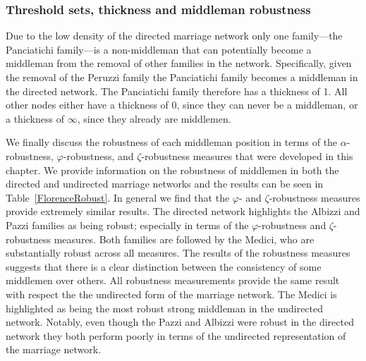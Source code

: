 \documentclass[11pt,fleqn]{article}
\begin{document}
\subsubsection{Threshold sets, thickness and middleman robustness}

Due to the low density of the directed marriage network only one family---the Panciatichi family---is a non-middleman that can potentially become a middleman from the removal of other families in the network. Specifically, given the removal of the Peruzzi family the Panciatichi family becomes a middleman in the directed network. The Panciatichi family therefore has a thickness of 1. All other nodes either have a thickness of 0, since they can never be a middleman, or a thickness of $\infty$, since they already are middlemen.

We finally discuss the robustness of each middleman position in terms of the $\alpha$-robustness, $\varphi$-robustness, and $\zeta$-robustness measures that were developed in this chapter. We provide information on the robustness of middlemen in both the directed and undirected marriage networks and the results can be seen in Table~\ref{FlorenceRobust}. In general we find that the $\varphi$- and $\zeta$-robustness measures provide extremely similar results. The directed network highlights the Albizzi and Pazzi families as being robust; especially in terms of the $\varphi$-robustness and $\zeta$-robustness measures. Both families are followed by the Medici, who are substantially robust across all measures. The results of the robustness measures suggests that there is a clear distinction between the consistency of some middlemen over others. All robustness measurements provide the same result with respect the the undirected form of the marriage network. The Medici is highlighted as being the most robust strong middleman in the undirected network. Notably, even though the Pazzi and Albizzi were robust in the directed network they both perform poorly in terms of the undirected representation of the marriage network.
\end{document}

